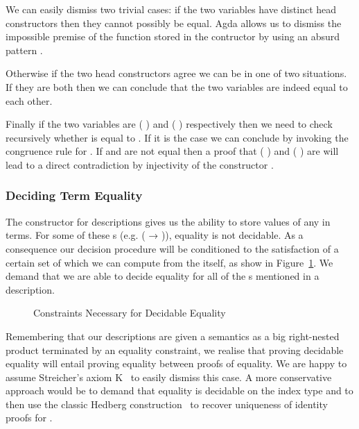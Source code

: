 
We can easily dismiss two trivial cases: if the two variables have distinct
head constructors then they cannot possibly be equal. Agda allows us to
dismiss the impossible premise of the function stored in the 
contructor by using an absurd pattern \AS{()}.


Otherwise if the two head constructors agree we can be in one of two
situations. If they are both  then we can conclude that the two
variables are indeed equal to each other.


Finally if the two variables are {( )} and {( )}
respectively then we need to check recursively whether  is equal
to . If it is the case we can conclude by invoking the congruence
rule for . If  and  are not equal then a proof that
{( )} and {( )} are will lead to a direct
contradiction by injectivity of the constructor .


\subsubsection{Deciding Term Equality}

The constructor  for descriptions gives us the ability to store
values of any  in terms. For some of these s (e.g.
{( → )}), equality is not decidable. As a consequence
our decision procedure will be conditioned to the satisfaction of a
certain set of  which we can compute from the 
itself, as show in Figure~\ref{fig:eqconstraints}. We demand that we are
able to decide equality for all of the s mentioned in a description.

\begin{figure}[h]
\caption{Constraints Necessary for Decidable Equality}\label{fig:eqconstraints}
\end{figure}

Remembering that our descriptions are given a semantics as a big right-nested
product terminated by an equality constraint, we realise that proving decidable
equality will entail proving equality between proofs of equality. We are happy
to assume Streicher's axiom K~\cite{DBLP:conf/lics/HofmannS94} to easily
dismiss this case. A more conservative approach would be to demand that equality
is decidable on the index type  and to then use the classic Hedberg
construction~\cite{DBLP:journals/jfp/Hedberg98} to recover uniqueness of
identity proofs for .

